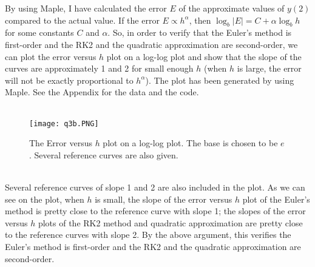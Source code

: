 \documentclass{article}
\begin{document}
By using Maple, I have calculated the error \(E\) of the approximate values of \(y(2)\) compared to the actual value. If the error \(E\propto h^{\alpha}\), then \(\log_b|E| =C + \alpha \log_b h\) for some constants \(C\) and \(\alpha\).
So, in order to verify that the Euler's method is first-order and the RK2 and the quadratic approximation are second-order, we can
plot the error versus \(h\) plot on a log-log plot and show that the slope of the curves are approximately 1 and 2 for small enough \(h\) (when \(h\) is large, the error will not be exactly proportional to \(h^\alpha\)).
The plot has been generated by using Maple. See the Appendix for the data and the code.
\pagebreak \\ \\
\begin{figure}
    \centering
    \texttt{[image: q3b.PNG]}
    \caption{The Error versus \(h\) plot on a log-log plot. The base is chosen to be \(e\). Several reference curves are also given. }
    \label{fig:label2}
\end{figure}\text{ }\\
Several reference curves of slope 1 and 2 are also included in the plot. As we can see on the plot, when \(h\) is small, the
slope of the error versus \(h\) plot of the Euler's method is pretty close to the reference curve with slope 1;
the slopes of the error versus \(h\) plots of the RK2 method and quadratic approximation are pretty close to the reference curves
with slope 2. By the above argument, this verifies the Euler's method is first-order and the RK2 and the quadratic approximation are second-order.
\pagebreak
\end{document}
